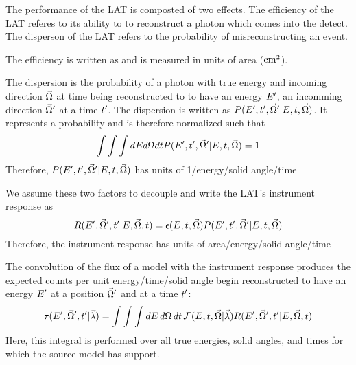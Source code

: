

The performance of the LAT is composted of two effects.
The efficiency of the LAT referes to its ability to to
reconstruct a photon which comes into the detect.
The disperson of the LAT refers to the probability of
misreconstructing an event. 

The efficiency is written as \efficiency and is measured in units of area ($\text{cm}^2$).

The dispersion is the probability of a photon with true energy \energy
and incoming direction $\vec\Omega$ at time \time being reconstructed to 
to have an energy $E'$, an incomming direction $\vec\Omega'$ at a time $t'$.
The dispersion is written as $P(E',t',\vec\Omega'|E,t,\vec\Omega)$.
It represents a probability and is therefore normalized such that
\begin{equation}
  \int \int \int dE d\Omega dt P(E',t',\vec\Omega'|E,t,\vec\Omega) = 1
\end{equation}
Therefore, $P(E',t',\vec\Omega'|E,t,\vec\Omega)$ 
has units of 1/energy/solid angle/time



We assume these two factors to decouple and write the LAT's instrument response as
\begin{equation}
  R(E',\vec\Omega',t'|E,\vec\Omega,t) = \epsilon(E,t,\vec\Omega) P(E',t',\vec\Omega'|E,t,\vec\Omega)
\end{equation}
Therefore, the instrument response has units of area/energy/solid angle/time

The convolution of the flux of a model with the instrument response 
produces the expected counts per unit energy/time/solid angle
begin reconstructed to have 
an energy $E'$ 
at a position $\vec\Omega'$ and at a time $t'$:
\begin{equation}
  \eqnlabel{eventrate}
  \eventrate(\energy',\solidangle',\time'|\modelparams)
  = \int \int \int \denergy \, \dsolidangle \, \dtime \,
  \fluxdensity(\energy,\time,\vec\Omega|\modelparams) \response(\energy',\solidangle',\time'|\energy,\solidangle,\time)
\end{equation}
Here, this integral is performed over all true energies, solid angles, and times
for which the source model has support.

